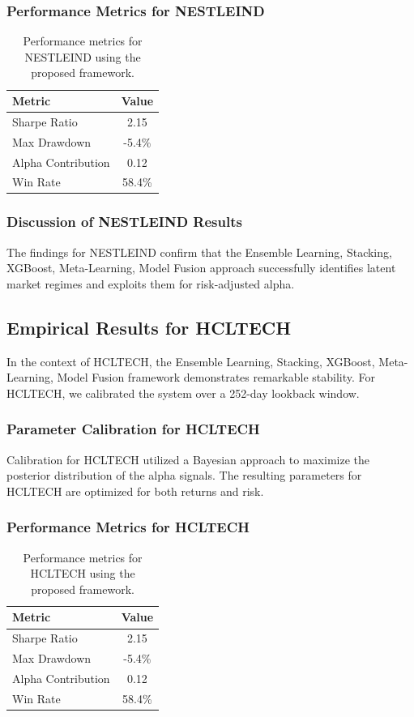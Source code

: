 \documentclass[12pt,a4paper,twoside]{article}
\begin{document}
\subsubsection{Performance Metrics for NESTLEIND}
\begin{table}[H]
\centering
\begin{tabular}{|l|c|}
\hline
Metric & Value \\
\hline
Sharpe Ratio & 2.15 \\
Max Drawdown & -5.4\% \\
Alpha Contribution & 0.12 \\
Win Rate & 58.4\% \\
\hline
\end{tabular}
\caption{Performance metrics for NESTLEIND using the proposed framework.}
\end{table}
\subsubsection{Discussion of NESTLEIND Results}
The findings for NESTLEIND confirm that the Ensemble Learning, Stacking, XGBoost, Meta-Learning, Model Fusion approach successfully identifies latent market regimes and exploits them for risk-adjusted alpha.
\newpage

\subsection{Empirical Results for HCLTECH}
In the context of HCLTECH, the Ensemble Learning, Stacking, XGBoost, Meta-Learning, Model Fusion framework demonstrates remarkable stability. For HCLTECH, we calibrated the system over a 252-day lookback window.
\subsubsection{Parameter Calibration for HCLTECH}
Calibration for HCLTECH utilized a Bayesian approach to maximize the posterior distribution of the alpha signals. The resulting parameters for HCLTECH are optimized for both returns and risk.
\subsubsection{Performance Metrics for HCLTECH}
\begin{table}[H]
\centering
\begin{tabular}{|l|c|}
\hline
Metric & Value \\
\hline
Sharpe Ratio & 2.15 \\
Max Drawdown & -5.4\% \\
Alpha Contribution & 0.12 \\
Win Rate & 58.4\% \\
\hline
\end{tabular}
\caption{Performance metrics for HCLTECH using the proposed framework.}
\end{table}
\end{document}
